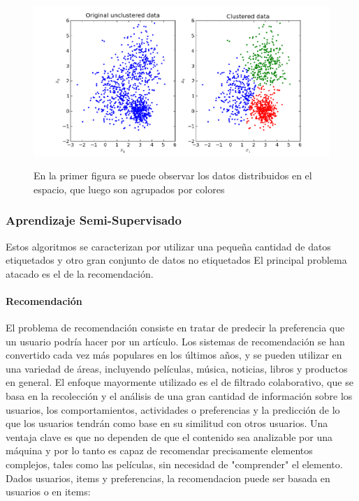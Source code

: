 \documentclass[a4paper,11pt,spanish]{book}
\begin{document}
	  \begin{figure}[h]
	    \includegraphics[scale=0.5]{./img/stackoverflow_clustering.png}\\
	    \caption{En la primer figura se puede observar los datos distribuidos en el espacio, que luego son agrupados por colores}
	    \label{fig:car_detection}
	  \end{figure}

      \subsubsection{Aprendizaje Semi-Supervisado}

	Estos algoritmos se caracterizan por utilizar una pequeña cantidad de datos etiquetados y otro gran conjunto de datos no etiquetados
	El principal problema atacado es el de la recomendación.
	\paragraph{Recomendación}
	  El problema de recomendación consiste en tratar de predecir la preferencia que un usuario podría hacer por un artículo. Los sistemas de recomendación se han convertido cada 
	  vez más populares en los últimos años, y se pueden utilizar en una variedad de áreas, incluyendo películas, música, noticias, libros y productos en general.
	  El enfoque mayormente utilizado es el de filtrado colaborativo, que se basa en la recolección y el análisis de una gran cantidad de información sobre los usuarios, 
	  los comportamientos, actividades o preferencias y la predicción de lo que los usuarios tendrán como base en su similitud con otros usuarios. 
	  Una ventaja clave es que no dependen de que el contenido sea analizable por una máquina  y por lo tanto es capaz de recomendar precisamente elementos complejos, 
	  tales como las películas, sin necesidad de "comprender" el elemento.
	  Dados usuarios, items y preferencias, la recomendacion puede ser basada en usuarios o en items:
\end{document}
